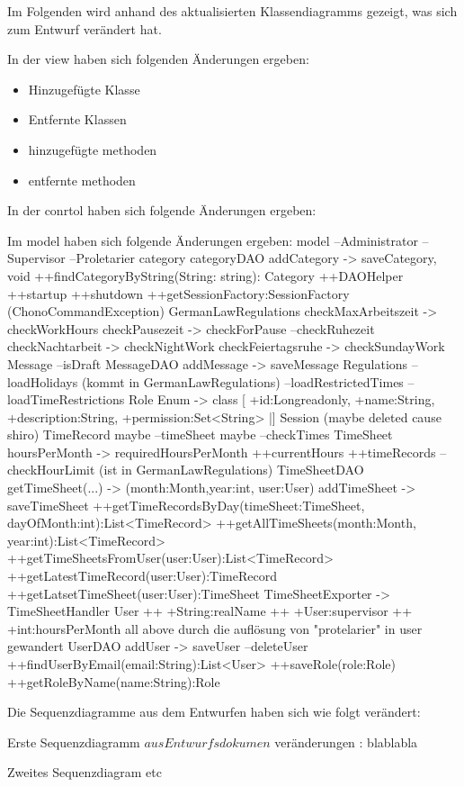 Im Folgenden wird anhand des aktualisierten Klassendiagramms gezeigt, was sich zum Entwurf verändert hat.


In der view haben sich folgenden Änderungen ergeben:
  \begin{itemize}
      \item Hinzugefügte Klasse
      \item Entfernte Klassen
      \item hinzugefügte methoden
      \item entfernte methoden
  \end{itemize}
  
In der conrtol haben sich folgende Änderungen ergeben:

Im model haben sich folgende Änderungen ergeben: %
model
  --Administrator
  --Supervisor
  --Proletarier
  category 
  categoryDAO
    addCategory -> saveCategory, void
    ++findCategoryByString(String: string): Category
  ++DAOHelper
    ++startup
    ++shutdown
    ++getSessionFactory:SessionFactory
  (ChonoCommandException)
  GermanLawRegulations
    checkMaxArbeitszeit ->  checkWorkHours
    checkPausezeit -> checkForPause
    --checkRuhezeit
    checkNachtarbeit -> checkNightWork
    checkFeiertagsruhe -> checkSundayWork
  Message
    --isDraft
  MessageDAO
    addMessage -> saveMessage
  Regulations
    --loadHolidays (kommt in GermanLawRegulations)
    --loadRestrictedTimes
    --loadTimeRestrictions
  Role
    Enum -> class
    [ +id:Long{readonly}, +name:String, +description:String, +permission:Set<String> |]
  Session
    (maybe deleted cause shiro)
  TimeRecord
    maybe --timeSheet
    maybe --checkTimes
  TimeSheet
    hoursPerMonth -> requiredHoursPerMonth
    ++currentHours
    ++timeRecords
    --checkHourLimit (ist in GermanLawRegulations)
   TimeSheetDAO
    getTimeSheet(...) -> (month:Month,year:int, user:User) 
    addTimeSheet -> saveTimeSheet
    ++getTimeRecordsByDay(timeSheet:TimeSheet, dayOfMonth:int):List<TimeRecord>
    ++getAllTimeSheets(month:Month, year:int):List<TimeRecord>
    ++getTimeSheetsFromUser(user:User):List<TimeRecord>
    ++getLatestTimeRecord(user:User):TimeRecord
    ++getLatsetTimeSheet(user:User):TimeSheet
    TimeSheetExporter -> TimeSheetHandler
    User
      ++ +String:realName
      ++ +User:supervisor
      ++ +int:hoursPerMonth
      all above durch die auflösung von "protelarier" in user gewandert
    UserDAO
      addUser -> saveUser
      --deleteUser
      ++findUserByEmail(email:String):List<User>
      ++saveRole(role:Role)
      ++getRoleByName(name:String):Role
    

Die Sequenzdiagramme aus dem Entwurfen haben sich wie folgt verändert:

Erste Sequenzdiagramm \(aus Entwurfsdokumen\) 
 veränderungen : blablabla
 
 Zweites Sequenzdiagram
 etc
